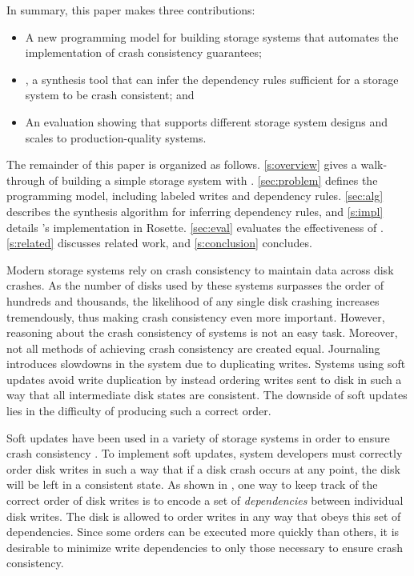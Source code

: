 In summary, this paper makes three contributions:
\begin{itemize}
\item A new programming model for building storage systems that automates the implementation of crash consistency guarantees;
\item \depsynth, a synthesis tool that can infer the dependency rules sufficient for a storage system to be crash consistent; and
\item An evaluation showing that \depsynth supports different storage system designs and scales to production-quality systems.
\end{itemize}

\noindent
The remainder of this paper is organized as follows.
\cref{s:overview} gives a walk-through of building a simple storage system with \depsynth.
\cref{sec:problem} defines the \depsynth programming model, including labeled writes and dependency rules.
\cref{sec:alg} describes the \depsynth synthesis algorithm for inferring dependency rules,
and \cref{s:impl} details \depsynth's implementation in Rosette.
\cref{sec:eval} evaluates the effectiveness of \depsynth.
\cref{s:related} discusses related work, and \cref{s:conclusion} concludes.\tighten

Modern storage systems rely on crash consistency to maintain data across disk crashes.
As the number of disks used by these systems surpasses the order of hundreds and thousands,
the likelihood of any single disk crashing increases tremendously, thus making crash
consistency even more important. However, reasoning about the crash consistency of systems
is not an easy task. Moreover, not all methods of achieving crash consistency are created equal.
Journaling introduces slowdowns in the system due to duplicating writes.
Systems using soft updates avoid write duplication by instead
ordering writes sent to disk in such a way that all intermediate disk states are consistent.
The downside of soft updates lies in the difficulty of producing such a correct order.

Soft updates have been used in a variety of storage systems in
order to ensure crash consistency . To implement soft updates, system
developers must correctly order disk writes in such a way that if a disk crash occurs
at any point, the disk will be left in a consistent state. As shown in ,
one way to keep track of the correct order of disk writes is to encode a set of \textit{dependencies}
between individual disk writes. The disk is allowed to order writes in any way that
obeys this set of dependencies.
Since some orders can be executed more quickly than others, it is desirable to minimize
write dependencies to only those necessary to ensure crash consistency.

